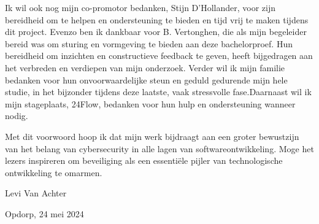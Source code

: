Ik wil ook nog mijn co-promotor bedanken, Stijn D'Hollander, voor zijn bereidheid om te helpen en ondersteuning te bieden en tijd vrij te maken 
tijdens dit project. Evenzo ben ik dankbaar voor B. Vertonghen, die als mijn begeleider bereid was om sturing en vormgeving te 
bieden aan deze bachelorproef. Hun bereidheid om inzichten en constructieve feedback te geven, heeft bijgedragen aan het verbreden en verdiepen van mijn onderzoek.
Verder wil ik mijn familie bedanken voor hun onvoorwaardelijke steun en geduld gedurende mijn hele studie, in het bijzonder tijdens deze laatste, 
vaak stressvolle fase.Daarnaast wil ik mijn stageplaats, 24Flow, bedanken voor hun hulp en ondersteuning wanneer nodig.

Met dit voorwoord hoop ik dat mijn werk bijdraagt aan een groter bewustzijn van het belang van cybersecurity in alle lagen van softwareontwikkeling. 
Moge het lezers inspireren om beveiliging als een essentiële pijler van technologische ontwikkeling te omarmen.


Levi Van Achter

Opdorp, 24 mei 2024
